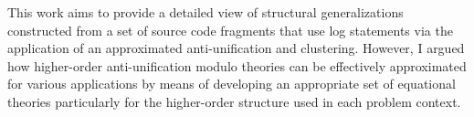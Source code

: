This work aims to provide a detailed view of structural generalizations constructed from a set of source code fragments that use log statements via the application of an approximated anti-unification and clustering. However, I argued how higher-order anti-unification modulo theories can be effectively approximated for various applications by means of developing an appropriate set of equational theories particularly for the higher-order structure used in each problem context.

